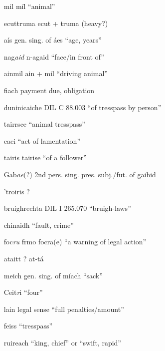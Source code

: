 \documentclass[11pt]{article}
\begin{document}
\begin{enumerate}
  \item[mil] m\'{i}l \enquote{animal}

  \item[ecuttruma] ecut + truma (heavy?)

  \item[a\'{i}s] gen. sing. of \'{a}es \enquote{age, years}

  \item[nag\emph{aid}] n-agaid \enquote{face/in front of}

  \item[ainmil] ain + mil \enquote{driving animal}

  \item[fiach] payment due, obligation

  \item[duninicaiche] DIL C 88.003 \enquote{of tresspass by person}

  \item[tairrsce] \enquote{animal tresspass}

  \item[caei] \enquote{act of lamentation}

  \item[tairis] tairise \enquote{of a follower}

  \item[Gab\emph{ae}(?)] 2nd pers. sing. pres. subj./fut. of gaibid

  \item['troiris] ?

  \item[bruighrechta] DIL I 265.070 \enquote{bruigh-laws}

  \item[chinaidh] \enquote{fault, crime}

  \item[foc\emph{ru}] frmo focra(e) \enquote{a warning of legal action}

  \item[ataitt] ? at-t\'{a}

  \item[meich] gen. sing. of m\'{i}ach \enquote{sack}

  \item[Ceit\emph{r}i] \enquote{four}

  \item[lain] legal sense \enquote{full penalties/amount}

  \item[feiss] \enquote{tresspass}

  \item[ruireach] \enquote{king, chief} or \enquote{swift, rapid}


\end{enumerate}
\end{document}

